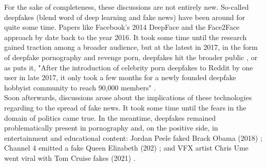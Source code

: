 \documentclass[
  a4paper,  %
  twoside,  %
  bibliography=totoc,
  headsepline,
  cleardoublepage=empty,
  parskip=half,
  draft=false
]{scrbook}
\begin{document}
For the sake of completeness, these discussions are not entirely new. So-called deepfakes (blend word of deep learning and fake news) have been around for quite some time. Papers like Facebook's 2014 DeepFace \cite{taigmanDeepFaceClosingGap2014} and the Face2Face approach by \citet{thiesFace2FaceRealtimeFace2020} date back to the year 2016. It took some time until the research gained traction among a broader audience, but at the latest in 2017, in the form of deepfake pornography and revenge porn, deepfakes hit the broader public \cite{coleAIAssistedFakePorn2017}, or as \citeauthor{westerlundEmergenceDeepfakeTechnology2019a} puts it, "After the introduction of celebrity porn deepfakes to Reddit by one user in late 2017, it only took a few months for a newly founded deepfake hobbyist community to reach 90,000 members" \cite{westerlundEmergenceDeepfakeTechnology2019a}. \\
Soon afterwards, discussions arose about the implications of these technologies regarding to the spread of fake news. It took some time until the fears in the domain of politics came true. In the meantime, deepfakes remained problematically present in pornography and, on the positive side, in entertainment and educational content: Jordan Peele faked Brack Obama (2018) \cite{vincentWatchJordanPeele2018}; Channel 4 emitted a fake Queen Elizabeth (202) \cite{DeepfakeQueenDeliver2020}; and VFX artist Chris Ume went viral with Tom Cruise fakes (2021) \cite{vincentTomCruiseDeepfake2021}.
\end{document}
